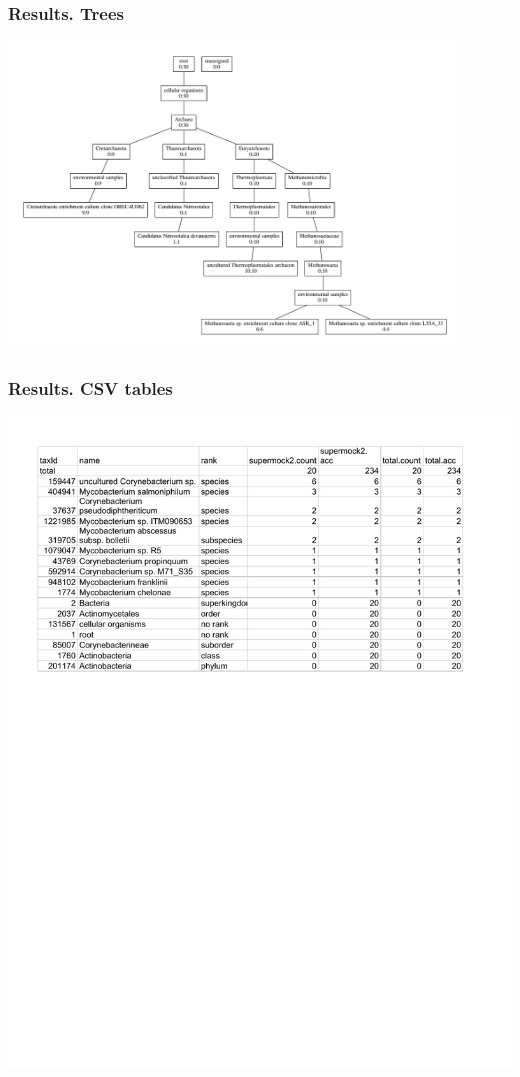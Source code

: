 \documentclass{beamer}
\begin{document}
\begin{frame}
\frametitle{Results. Trees}
\includegraphics[width=0.9\textwidth]{tree.pdf}
\end{frame}


\begin{frame}
\frametitle{Results. CSV tables}
\includegraphics[width=\textwidth]{table.pdf}
\end{frame}
\end{document}
